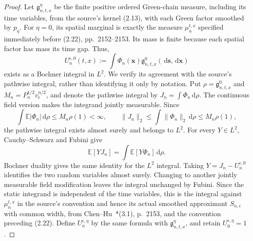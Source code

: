 \documentclass[12pt]{article}
\numberwithin{equation}{section}
\theoremstyle{definition}
\newcommand{\E}{\mathbb{E}}
\newcommand{\ud}{\,\mathrm{d}}
\begin{document}
\begin{proof}
  Let $\mathfrak{g}_{n,t,x}^{\eta}$ be the finite positive ordered
  Green-chain measure, including its time variables, from the
  source's kernel (2.13), with each Green factor smoothed by $p_\eta$.
  For $\eta=0$, its spatial marginal is exactly the measure
  $\mu_n^{t,x}$ specified immediately before (2.22), pp.~2152--2153.
  Its mass is finite because each spatial factor has mass its time
  gap. Thus,
  \[
    U_n^{\epsilon,0}(t,x)
    :=\int\Phi_n(\mathbf{x})
    \mathfrak{g}_{n,t,x}^{0}(\ud\mathbf{s},\ud\mathbf{x})
  \]
  exists as a Bochner integral in $L^2$.
  We verify its agreement with the source's pathwise integral,
  rather than identifying it only by notation. Put
  $\rho=\mathfrak{g}_{n,t,x}^{0}$ and
  $M_n=P_n^{1/2}v_\epsilon^{n/2}$, and denote the pathwise integral
  by $J_n=\int\Phi_n\ud\rho$.
  The continuous field version makes the integrand jointly
  measurable. Since
  \[
    \int\E|\Phi_n|\ud\rho\le M_n\rho(1)<\infty,
    \qquad
    \|J_n\|_2
    \le\int\|\Phi_n\|_2\ud\rho\le M_n\rho(1),
  \]
  the pathwise integral exists almost surely and belongs to $L^2$.
  For every $Y\in L^2$, Cauchy--Schwarz and Fubini give
  \[
    \E[YJ_n]
    =\int\E[Y\Phi_n]\ud\rho.
  \]
  Bochner duality gives the same identity for the $L^2$ integral.
  Taking $Y=J_n-U_n^{\epsilon,0}$ identifies the two random
  variables almost surely. Changing to another jointly measurable
  field modification leaves the integral unchanged by Fubini.
  Since the static integrand is independent of the time variables,
  this is the integral against $\mu_n^{t,x}$ in the source's
  convention and hence its actual smoothed approximant
  $S_{n,\epsilon}$ with common width, from
  Chen--Hu~\cite{chen.hu:25:hyperbolic}*{(3.1), p.~2153,
  and the convention preceding (2.22)}.
  Define $U_n^{\epsilon,\eta}$ by the same formula with
  $\mathfrak{g}_{n,t,x}^{\eta}$, and retain $U_0^{\epsilon,\eta}=1$.


\end{proof}
\end{document}
